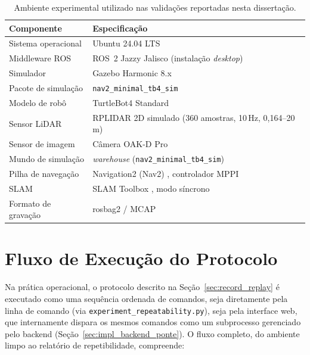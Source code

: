 \begin{table}[H]
\centering
\caption{Ambiente experimental utilizado nas validações reportadas nesta dissertação.}
\label{tab:ambiente_hw}
\begin{tabularx}{\textwidth}{lX}
\toprule
\textbf{Componente} & \textbf{Especificação} \\
\midrule
Sistema operacional & Ubuntu 24.04 LTS \\
Middleware ROS & ROS~2 Jazzy Jalisco (instalação \textit{desktop}) \cite{macenski2022ros2} \\
Simulador & Gazebo Harmonic 8.x \cite{koenig2004gazebo} \\
Pacote de simulação & \texttt{nav2\_\allowbreak minimal\_\allowbreak tb4\_\allowbreak sim} \\
Modelo de robô & TurtleBot4 Standard \\
Sensor LiDAR & RPLIDAR 2D simulado (360 amostras, 10\,Hz, 0,164--20\,m) \\
Sensor de imagem & Câmera OAK-D Pro \\
Mundo de simulação & \textit{warehouse} (\texttt{nav2\_\allowbreak minimal\_\allowbreak tb4\_\allowbreak sim}) \\
Pilha de navegação & Navigation2 (Nav2) \cite{macenski2020marathon}, controlador MPPI \cite{williams2016} \\
SLAM & SLAM Toolbox \cite{macenski2021slam}, modo síncrono \\
Formato de gravação & rosbag2 / MCAP \\
\bottomrule
\end{tabularx}
\end{table}

\section{Fluxo de Execução do Protocolo}
\label{sec:fluxo_protocolo}

Na prática operacional, o protocolo descrito na Seção~\ref{sec:record_replay}
é executado como uma sequência ordenada de comandos, seja diretamente pela
linha de comando (via \texttt{experiment\_\allowbreak repeatability.py}), seja pela
interface web, que internamente dispara os mesmos comandos como um subprocesso
gerenciado pelo backend (Seção~\ref{sec:impl_backend_ponte}). O fluxo completo,
do ambiente limpo ao relatório de repetibilidade, compreende:

